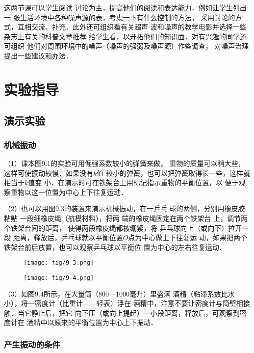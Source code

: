 这两节课可以学生阅读
讨论为主，提高他们的阅读和表达能力．例如让学生列出一
张生活环境中各种噪声源的表，考虑一下有什么控制的方法，
采用讨论的方式，互相交流、补充．此外还可组织看有关超声
波和噪声的教学电影并选择一些杂志上有关的科普文章推荐
给学生看，以开拓他们的知识面．对有兴趣的同学还可组织
他们对周围环境中的噪声（噪声的强弱及噪声源）作些调查，
对噪声治理提出一些建议和办法．

\section{实验指导}
\subsection{演示实验}
\subsubsection{机械振动}
（1）课本图9.1的实验可用倔强系数较小的弹簧来做，
重物的质量可以稍大些，这样可使振动较慢．如果没有$k$值
较小的弹簧，也可以把弹簧取得长一些，这样就相当于$k$值变
小．在演示时可在铁架台上用标记指示重物的平衡位置，以
便于观察重物以这一位置为中心上下往复运动．

（2）也可以用图9.3的装置来演示机械振动，在一乒乓
球的两侧，分别用橡皮胶粘贴
一段细橡皮绳（航模材料），将两
端的橡皮绳固定在两个铁架台
上，调节两个铁架台间的距离，
使得两段橡皮绳都被绷紧，将
乒乓球向上（或向下）拉开一段
距离，释放后，乒乓球就以平衡位置$O$点为中心做上下往复运
动，如果把两个铁架台前后放置，也可以观察乒乓球以平衡位
置为中心的左右往复运动．
\begin{figure}[htp]\centering
    \begin{minipage}[t]{0.48\textwidth}
    \centering
\texttt{[image: fig/9-3.png]}
    \caption{}
    \end{minipage}
    \begin{minipage}[t]{0.48\textwidth}
    \centering
\texttt{[image: fig/9-4.png]}
    \caption{}
    \end{minipage}
    \end{figure}

    （3）如图9.4所示，在大量筒（800—1000毫升）里盛满
酒精（粘滞系数比水小），将一密度计（比重计——轻表）浮在
酒精中，注意不要让密度计与筒壁相接触．当它静止后，把它
向下压（或向上提起）一小段距离，释放后，可观察到密度计在
酒精中以原来的平衡位置为中心上下振动．

\subsubsection{产生振动的条件}

